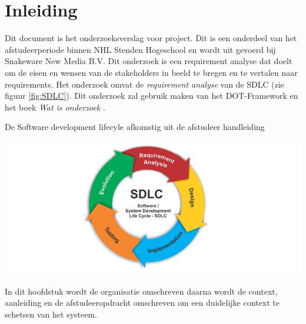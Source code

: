 \chapter{Inleiding}
Dit document is het onderzoeksverslag voor  project.
Dit is een onderdeel van het afstudeerperiode binnen NHL Stenden Hogeschool en wordt uit gevoerd bij Snakeware New Media B.V.
Dit onderzoek is een requirement analyse dat doelt om de eisen en wensen van de stakeholders in beeld te bregen en te vertalen naar requirements.
Het onderzoek omvat de \textit{requirement analyse} van de \gls{SDLC} (zie figuur \ref{fig:SDLC}).
Dit onderzoek zal gebruik maken van het DOT-Framework \Parencite{DOT-Framework} en het boek \textit{Wat is onderzoek} \Parencite{Verhoeven}.   \\
\begin{graphic}
    \vspace{0.2cm}
    \captionsetup{type=figure}
    \caption{De Software development lifecyle afkomstig uit de afstudeer handleiding \Parencite{Afstudeerhandleiding}}
    \includegraphics[scale=0.5]{img/SDLC.png}
    \label{fig:SDLC}
    \vspace{0.2cm}
\end{graphic}
In dit hoofdstuk wordt de organisatie omschreven daarna wordt de context, aanleiding en de afstudeeropdracht omschreven om een duidelijke context te schetsen van het systeem.



% 


